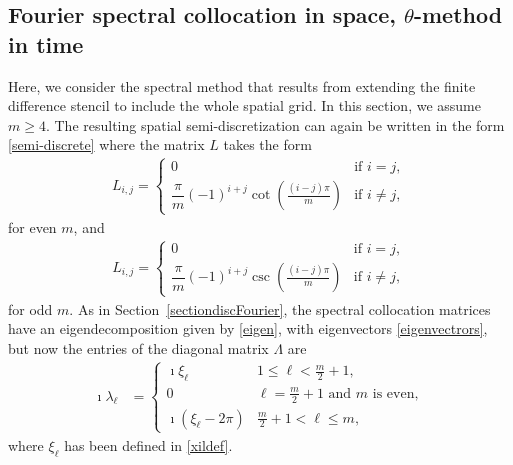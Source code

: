 \documentclass[smallextended,numbook,runningheads]{svjour3}     %
\begin{document}
\subsection{Fourier spectral collocation in space, \texorpdfstring{$\theta$}{}-method in time}\label{spectrcoll}
Here, we consider the spectral method that results from extending the
finite difference stencil to include the whole spatial grid.  In this section, we assume $m\ge 4$. The resulting spatial 
semi-discretization can again be written in the form \eqref{semi-discrete}
where the matrix $L$ takes the form \cite{trefethen,peyret}
\begin{align*}
	L_{i,j} = \begin{cases}
						0 & \text{if } i = j, \\[10pt]
						\dfrac{\pi}{m}(-1)^{i+j}\cot{\!\left(\frac{(i-j)\pi}{m}\right)} & \text{if } i \neq j,
					\end{cases}
\end{align*}
for even $m$, and
\begin{align*}
	L_{i,j} = \begin{cases}
						0 & \text{if } i = j, \\[10pt]
						\dfrac{\pi}{m}(-1)^{i+j}\csc{\!\left(\frac{(i-j)\pi}{m}\right)} & \text{if } i \neq j,
					\end{cases}
\end{align*}
for odd $m$.
As in Section~\ref{sectiondiscFourier}, the spectral collocation matrices have an eigendecomposition given by
\eqref{eigen}, with eigenvectors \eqref{eigenvectrors}, but now the entries of the diagonal matrix $\Lambda$ are
\begin{align}\label{lambdaSCdef}
    \imath\lambda_\ell & =
    \begin{cases}
        \imath\xi_\ell & 1 \le \ell < \frac{m}{2}+1, \\
        0 & \ell = \frac{m}{2}+1 \text{ and } m \text{ is even}, \\ %
        \imath(\xi_\ell - 2\pi) & \frac{m}{2}+1 < \ell \le m,
    \end{cases}
\end{align}
where $\xi_\ell$ has been defined in \eqref{xildef}.
\end{document}
